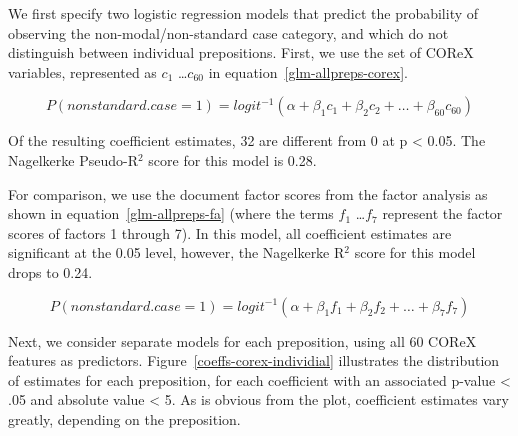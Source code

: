 \documentclass[11pt]{article}
\begin{document}
We first specify two logistic regression models that predict the probability of observing the non-modal/non-standard case category, and which do not distinguish between individual prepositions. First, we use the set of COReX variables, represented as $c_1$ \ldots $c_{60}$ in equation~\ref{glm-allpreps-corex}.

\begin{equation}
\label{glm-allpreps-corex}
  P(nonstandard.case=1) = logit^{-1}(\alpha + \beta_1 c_1 + \beta_2 c_2 + \dots + \beta_{60} c_{60})
\end{equation}

Of the resulting coefficient estimates, 32 are different from 0 at p < 0.05. The Nagelkerke Pseudo-R$^2$ score for this model is 0.28.

For comparison, we use the document factor scores from the factor analysis as shown in equation~\ref{glm-allpreps-fa} (where the terms $f_1$ \ldots $f_7$ represent the factor scores of factors 1 through 7). In this model, all coefficient estimates are significant at the 0.05 level, however, the Nagelkerke R$^2$ score for this model drops to 0.24.

\begin{equation}
\label{glm-allpreps-fa}
  P(nonstandard.case=1) = logit^{-1}(\alpha + \beta_1 f_1 + \beta_2 f_2 + \dots + \beta_{7} f_{7})
\end{equation}


Next, we consider separate models for each preposition, using all 60 COReX features as predictors. Figure~\ref{coeffs-corex-individial} illustrates the distribution of estimates for each preposition, for each coefficient with an associated p-value < .05 and absolute value < 5. As is obvious from the plot, coefficient estimates vary greatly, depending on the preposition. 
\end{document}
